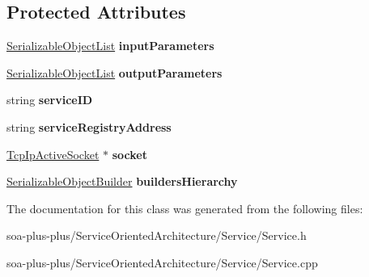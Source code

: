 \subsection*{Protected Attributes}
\begin{DoxyCompactItemize}
\item 
\hypertarget{class_service_aed227ecbb195eab2fbada11483620527}{
\hyperlink{class_pointer_list}{SerializableObjectList} {\bfseries inputParameters}}
\label{class_service_aed227ecbb195eab2fbada11483620527}

\item 
\hypertarget{class_service_a310272d3dd3a9498e63f1273e5a48a12}{
\hyperlink{class_pointer_list}{SerializableObjectList} {\bfseries outputParameters}}
\label{class_service_a310272d3dd3a9498e63f1273e5a48a12}

\item 
\hypertarget{class_service_a4764a7f407df7d696a4ef5b3c32b252a}{
string {\bfseries serviceID}}
\label{class_service_a4764a7f407df7d696a4ef5b3c32b252a}

\item 
\hypertarget{class_service_a0dc476626fd3eb12bd5e8affa4cd3c39}{
string {\bfseries serviceRegistryAddress}}
\label{class_service_a0dc476626fd3eb12bd5e8affa4cd3c39}

\item 
\hypertarget{class_service_a0a80cecf325d995109704ded9d32b498}{
\hyperlink{class_tcp_ip_active_socket}{TcpIpActiveSocket} $\ast$ {\bfseries socket}}
\label{class_service_a0a80cecf325d995109704ded9d32b498}

\item 
\hypertarget{class_service_a74a929c92b0b828e18d37338bd565abf}{
\hyperlink{class_serializable_object_builder}{SerializableObjectBuilder} {\bfseries buildersHierarchy}}
\label{class_service_a74a929c92b0b828e18d37338bd565abf}

\end{DoxyCompactItemize}


The documentation for this class was generated from the following files:\begin{DoxyCompactItemize}
\item 
soa-\/plus-\/plus/ServiceOrientedArchitecture/Service/Service.h\item 
soa-\/plus-\/plus/ServiceOrientedArchitecture/Service/Service.cpp\end{DoxyCompactItemize}
